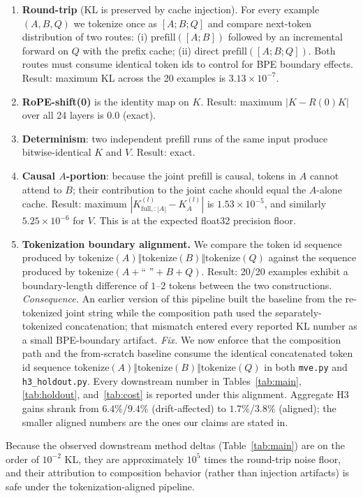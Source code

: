 \documentclass[11pt]{article}
\begin{document}
\begin{enumerate}[leftmargin=*]
    \item \textbf{Round-trip} (KL is preserved by cache injection). For every example $(A, B, Q)$ we tokenize once as $[A; B; Q]$ and compare next-token distribution of two routes: (i) $\mathrm{prefill}([A;B])$ followed by an incremental forward on $Q$ with the prefix cache; (ii) direct $\mathrm{prefill}([A;B;Q])$. Both routes must consume identical token ids to control for BPE boundary effects.
    Result: maximum KL across the 20 examples is $3.13\times10^{-7}$.
    \item \textbf{RoPE-shift(0)} is the identity map on $K$. Result: maximum $|K - R(0)K|$ over all 24 layers is $0.0$ (exact).
    \item \textbf{Determinism}: two independent prefill runs of the same input produce bitwise-identical $K$ and $V$. Result: exact.
    \item \textbf{Causal $A$-portion}: because the joint prefill is causal, tokens in $A$ cannot attend to $B$; their contribution to the joint cache should equal the $A$-alone cache. Result: maximum $|K^{(l)}_{\text{full}, :|A|} - K^{(l)}_A|$ is $1.53\times10^{-5}$, and similarly $5.25\times10^{-6}$ for $V$. This is at the expected float32 precision floor.
    \item \textbf{Tokenization boundary alignment.} We compare the token id sequence produced by $\mathrm{tokenize}(A) \Vert \mathrm{tokenize}(B) \Vert \mathrm{tokenize}(Q)$ against the sequence produced by $\mathrm{tokenize}(A + \text{`` ''} + B + Q)$. Result: 20/20 examples exhibit a boundary-length difference of $1$--$2$ tokens between the two constructions. \emph{Consequence.} An earlier version of this pipeline built the baseline from the re-tokenized joint string while the composition path used the separately-tokenized concatenation; that mismatch entered every reported KL number as a small BPE-boundary artifact. \emph{Fix.} We now enforce that the composition path and the from-scratch baseline consume the identical concatenated token id sequence $\mathrm{tokenize}(A) \Vert \mathrm{tokenize}(B) \Vert \mathrm{tokenize}(Q)$ in both \texttt{mve.py} and \texttt{h3\_holdout.py}. Every downstream number in Tables~\ref{tab:main}, \ref{tab:holdout}, and~\ref{tab:cost} is reported under this alignment. Aggregate H3 gains shrank from $6.4\%$/$9.4\%$ (drift-affected) to $1.7\%$/$3.8\%$ (aligned); the smaller aligned numbers are the ones our claims are stated in.
\end{enumerate}

Because the observed downstream method deltas (Table~\ref{tab:main}) are on the order of $10^{-2}$ KL, they are approximately $10^5$ times the round-trip noise floor, and their attribution to composition behavior (rather than injection artifacts) is safe under the tokenization-aligned pipeline.
\end{document}
